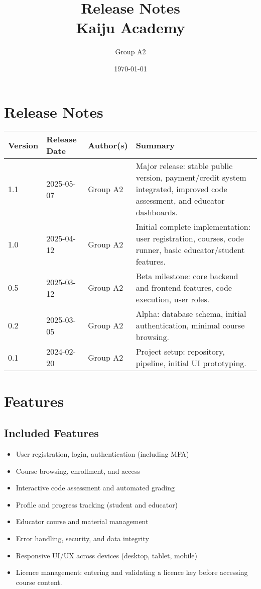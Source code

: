 \documentclass[a4paper,11pt]{scrartcl}
\title{Release Notes\\Kaiju Academy}
\author{Group A2}
\date{\today}
\begin{document}
\maketitle

\section*{Release Notes}

\begin{tabularx}{\textwidth}{l l l X}
\toprule
Version & Release Date & Author(s) & Summary \\
\midrule
1.1 & 2025-05-07 & Group A2 & Major release: stable public version, payment/credit system integrated, improved code assessment, and educator dashboards. \\
1.0 & 2025-04-12 & Group A2 & Initial complete implementation: user registration, courses, code runner, basic educator/student features. \\
0.5 & 2025-03-12 & Group A2 & Beta milestone: core backend and frontend features, code execution, user roles. \\
0.2 & 2025-03-05 & Group A2 & Alpha: database schema, initial authentication, minimal course browsing. \\
0.1 & 2024-02-20 & Group A2 & Project setup: repository, pipeline, initial UI prototyping. \\
\bottomrule
\end{tabularx}

\vspace{1.5em}

\section{Features}

\subsection{Included Features}
\begin{itemize}[leftmargin=*]
    \item User registration, login, authentication (including MFA)
    \item Course browsing, enrollment, and access
    \item Interactive code assessment and automated grading
    \item Profile and progress tracking (student and educator)
    \item Educator course and material management
    \item Error handling, security, and data integrity
    \item Responsive UI/UX across devices (desktop, tablet, mobile)
    \item Licence management: entering and validating a licence key before accessing course content.
\end{itemize}
\end{document}
